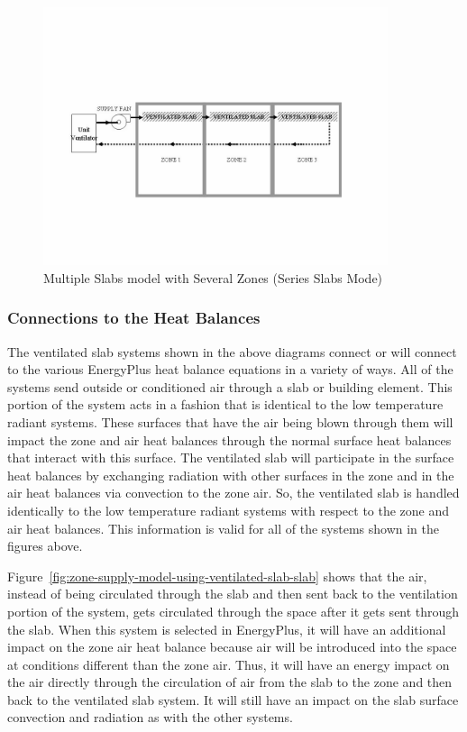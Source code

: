 \begin{figure}[hbtp] %
\centering
\includegraphics[width=0.9\textwidth, height=0.9\textheight, keepaspectratio=true]{media/image7399.png}
\caption{Multiple Slabs model with Several Zones (Series Slabs Mode) \protect \label{fig:multiple-slabs-model-with-several-zones}}
\end{figure}

\subsubsection{Connections to the Heat Balances}\label{connections-to-the-heat-balances}

The ventilated slab systems shown in the above diagrams connect or will connect to the various EnergyPlus heat balance equations in a variety of ways. All of the systems send outside or conditioned air through a slab or building element. This portion of the system acts in a fashion that is identical to the low temperature radiant systems. These surfaces that have the air being blown through them will impact the zone and air heat balances through the normal surface heat balances that interact with this surface. The ventilated slab will participate in the surface heat balances by exchanging radiation with other surfaces in the zone and in the air heat balances via convection to the zone air. So, the ventilated slab is handled identically to the low temperature radiant systems with respect to the zone and air heat balances. This information is valid for all of the systems shown in the figures above.

Figure~\ref{fig:zone-supply-model-using-ventilated-slab-slab} shows that the air, instead of being circulated through the slab and then sent back to the ventilation portion of the system, gets circulated through the space after it gets sent through the slab. When this system is selected in EnergyPlus, it will have an additional impact on the zone air heat balance because air will be introduced into the space at conditions different than the zone air. Thus, it will have an energy impact on the air directly through the circulation of air from the slab to the zone and then back to the ventilated slab system. It will still have an impact on the slab surface convection and radiation as with the other systems.

